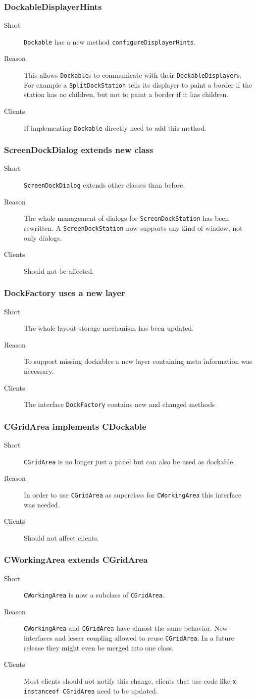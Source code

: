 \documentclass[a4paper,10pt]{article}
\newcommand{\src}[1]{\lstinline[basicstyle=\normalsize\ttfamily,keywordstyle=\normalsize\ttfamily,identifierstyle=\normalsize\ttfamily]|#1|}
\newcommand{\short}{\item[Short]}
\newcommand{\why}{\item[Reason]}
\newcommand{\clients}{\item[Clients]}
\begin{document}
\subsubsection{DockableDisplayerHints}
\begin{description}
 \short \src{Dockable} has a new method \src{configureDisplayerHints}.
 \why This allows \src{Dockable}s to communicate with their \src{DockableDisplayer}s. For example a \src{SplitDockStation} tells its displayer to paint a border if the station has no children, but not to paint a border if it has children.
 \clients If implementing \src{Dockable} directly need to add this method.
\end{description}

\subsubsection{ScreenDockDialog extends new class}
\begin{description}
 \short \src{ScreenDockDialog} extends other classes than before.
 \why The whole management of dialogs for \src{ScreenDockStation} has been rewritten. A \src{ScreenDockStation} now supports any kind of window, not only dialogs.
 \clients Should not be affected.
\end{description}

\subsubsection{DockFactory uses a new layer}
\begin{description}
 \short The whole layout-storage mechanism has been updated.
 \why To support missing dockables a new layer containing meta information was necessary.
 \clients The interface \src{DockFactory} contains new and changed methods
\end{description}

\subsubsection{CGridArea implements CDockable}
\begin{description}
 \short \src{CGridArea} is no longer just a panel but can also be used as dockable.
 \why In order to use \src{CGridArea} as superclass for \src{CWorkingArea} this interface was needed.
 \clients Should not affect clients.
\end{description}

\subsubsection{CWorkingArea extends CGridArea}
\begin{description}
 \short \src{CWorkingArea} is now a subclass of \src{CGridArea}.
 \why \src{CWorkingArea} and \src{CGridArea} have almost the same behavior. New interfaces and lesser coupling allowed to reuse \src{CGridArea}. In a future release they might even be merged into one class.
 \clients Most clients should not notify this change, clients that use code like \src{x instanceof CGridArea} need to be updated.
\end{description}
\end{document}
